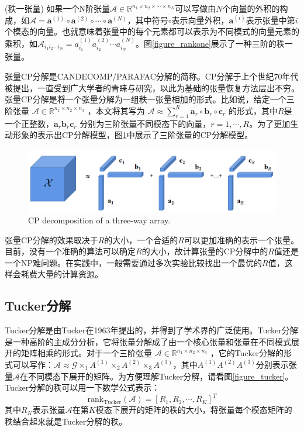 \begin{definition}
	(秩一张量) 如果一个N阶张量$ \mathcal{A}\in \mathbb{R}^{n_1\times n_2\times \cdots \times n_N} $可以写做由$ N $个向量的外积的构成，如$ \mathcal{A}=\mathbf{a}^{(1)}\circ \mathbf{a}^{(2)} \circ \cdots \circ \mathbf{a}^{(N)} $，其中符号$ \circ $表示向量外积，$ \mathbf{a}^{(i)} $表示张量中第$ i $个模态的向量。也就意味着张量中的每个元素都可以表示为不同模式的向量元素的乘积，如$ \mathcal{A}_{i_1i_2\cdots i_N}=a^{(1)}_{i_1}a^{(2)}_{i_2}\cdots a^{(N)}_{i_N}  $。图\ref{figure_rankone}展示了一种三阶的秩一张量。
\end{definition}

张量CP分解是CANDECOMP/PARAFAC分解\cite{kolda_tensor_2009}的简称。CP分解于上个世纪70年代被提出\cite{carroll_analysis_1970,harshman1970foundations}，一直受到广大学者的青睐与研究，以此为基础的张量恢复方法层出不穷。张量CP分解是将一个张量分解为一组秩一张量相加的形式。比如说，给定一个三阶张量 $ \mathcal{A}\in \mathbb{R}^{n_1\times n_2\times n_3} $ ，本文将其写为 $ \mathcal{A}\approx  \sum_{r=1}^{R}\mathbf{a}_r\circ \mathbf{b}_r \circ  \mathbf{c}_r$ 的形式，其中$ R $是一个正整数，$ \mathbf{a}_r\mathbf{b}_r\mathbf{c}_r $ 分别为三阶张量不同模态下的向量，$ r=1,\cdots,R $。为了更加生动形象的表示出CP分解模型，图\ref{figure_cp}中展示了三阶张量的CP分解模型。
\begin{figure}[htbp]
	\centering
	\includegraphics[scale=0.5]{pic/chap2/5.png}
	{CP decomposition of a three-way array.}
	\label{figure_cp}
\end{figure}

张量CP分解的效果取决于$ R $的大小，一个合适的$ R $可以更加准确的表示一个张量。目前，没有一个准确的算法可以确定$ R $的大小，故计算张量的CP分解中的$ R $值还是一个NP难问题。在实践中，一般需要通过多次实验比较找出一个最优的$ R $值，这样会耗费大量的计算资源。

\subsection{Tucker分解}
Tucker分解是由Tucker\cite{tucker1966some}在1963年提出的，并得到了学术界的广泛使用。Tucker分解是一种高阶的主成分分析，它将张量分解成了由一个核心张量和张量在不同模式展开的矩阵相乘的形式。对于一个三阶张量 $ \mathcal{A}\in \mathbb{R}^{n_1\times n_2\times n_3} $ ，它的Tucker分解的形式可以写作：$ \mathcal{A}\approx \mathcal{G}\times_1A^{(1)}\times_2A^{(2)}\times_3A^{(3)} $，其中$ A^{(1)}A^{(2)}A^{(3)} $分别表示张量$ \mathcal{A} $在不同模态下展开的矩阵。为方便理解Tucker分解，请看图\ref{figure_tucker}。Tucker分解的秩可以用一下数学公式表示：
\begin{equation}
\text{rank}_{\text{Tucker}}(\mathcal{A})=[R_1,R_2,\cdots,R_K]^T	
\end{equation}
其中$ R_K $表示张量$ \mathcal{A} $在第$ K $模态下展开的矩阵的秩的大小，将张量每个模态矩阵的秩结合起来就是Tucker分解的秩。


